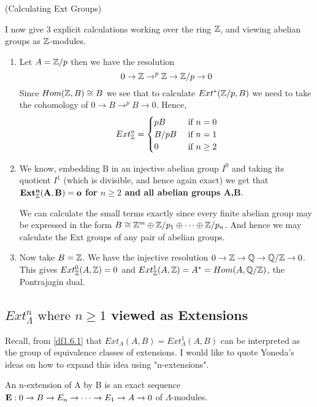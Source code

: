 \begin{example}(Calculating Ext Groups\label{1.6.3})

I now give 3 explicit calculations working over the ring $\mathbb Z$, and
viewing abelian groups as $\mathbb Z$-modules.
\begin{enumerate}
    \item Let $A=\mathbb Z /p$ then we have the resolution $$0\rightarrow
    \mathbb Z\rightarrow^{p} \mathbb Z\rightarrow \mathbb Z /p\rightarrow 0$$ Since
    $Hom(\mathbb Z,B)\cong B$ we see that to calculate $Ext^*(\mathbb Z/p,B)$ we
    need to take the cohomology of $0\rightarrow B\rightarrow^p
    B\rightarrow  0$. Hence,
    $$Ext_\mathbb Z^n =  \begin{cases}
      pB   &   \text{ if } n=0 \\
      B/{pB} &   \text{ if } n=1 \\
      0    &   \text{ if } n\geq 2 
    \end{cases}$$

    \item We know, embedding B in an injective abelian group $I^0$ and
taking its quotient $I^1$ (which is divisible, and hence again exact)
we get that \\ \textbf{$\mathbf{Ext_\mathbb Z^n (A,B) = o}$ for $n\geq 2$
and all abelian groups A,B}.

We can calculate the small terms exactly since every finite
abelian group may be expressed in the form $B\cong \mathbb Z^m\oplus
\mathbb Z/p_1\oplus \dots \oplus \mathbb Z/p_n$. And hence we may calculate the
Ext groups of any pair of abelian groups.

    \item Now take $B=\mathbb Z$. We have the injective resolution
    $0\rightarrow \mathbb Z\rightarrow \mathbb Q\rightarrow \mathbb Q /\mathbb Z \rightarrow
    0$. This gives $Ext^0_\mathbb Z (A,\mathbb Z) = 0$ and $Ext_\mathbb Z^1 (A,\mathbb Z) =
    A^*= Hom(A,\mathbb Q / \mathbb Z)$, the Pontrajagin dual.
\end{enumerate}
\end{example}

\subsection{$Ext_\Lambda^n\text{ where }n\geq 1$ viewed as Extensions}\label{1.6.4}

Recall, from \ref{df1.6.1} that $Ext_\Lambda (A,B) = Ext_\Lambda^1
(A,B)$ can be interpreted as the group of equivalence classes of
extensions. I would like to quote Yoneda's ideas on how to expand
this idea using "n-extensions".

An n-extension of A by B is an exact sequence $\textbf E :
0\rightarrow B\rightarrow E_n \rightarrow \dots \rightarrow E_1
\rightarrow A \rightarrow 0 $ of $\Lambda$-modules.

